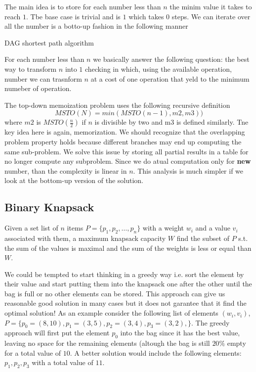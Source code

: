 	The main idea is to store for each number less than $n$ the minim value it takes to reach $1$. Tbe base case is trivial and is $1$ which takes $0$ steps.
	We can iterate over all the number is a botto-up fashion in the following manner
	
	\begin{algorithm}\label{alg:dagshortest}
\caption{DAG shortest path algorithm}
\end{algorithm}
For each number less than $n$ we basically answer the following question: the best way to transform $n$ into $1$ checking in which, using the available operation, number we can trasnform $n$ at a cost of one operation that yeld to the minimum numeber of operation. 

The top-down memoization problem uses the following recursive definition
\[
	MSTO(N) = min(MSTO(n-1),m2,m3))
\]
where $m2$ is $MSTO(\frac{n}{2})$ if $n$ is divisible by two and m3 is defined similarly. Tne key idea here is again, memorization. We should recognize that the overlapping problem property holds because different branches may end up computing the same sub-problem. We solve this issue by storing all partial results in a table for no longer compute any subproblem.
Since we do atual computation only for \textbf{new} number, than the complexity is linear in $n$.  This analysis is much simpler if we look at the bottom-up version of the solution.

\subsection{Binary Knapsack}
Given a set list of $n$ items $P=\{p_1,p_2,\ldots,p_n\}$ with a weight  $w_i$ and a value $v_i$ associated with them, a maximum knapsack capacity $W$ find the subset of $P$
s.t. the sum of the values is maximal and the sum of the weights is less or equal than $W$.

We could be tempted to start thinking in a greedy way i.e. sort the element by their value and start putting them into the knapsack one after the other until the bag is full or no other elements can be stored. This approach can give us reasonable good solution in many cases but it does not garantee that it find the optimal solution!
As an example consider the following list of elements $(w_i,v_i)$, $P=\{p_0=(8,10),p_1=(3,5),p_2=(3,4),p_3=(3,2),\}$. The greedy approach will first put the element $p_0$ into the bag since it has the best value, leaving no space for the remaining elements (altough the bag is still $20\%$ empty for a total value of $10$. A better solution would include the following elements: $p_1,p_2,p_3$ with a total value of $11$.

